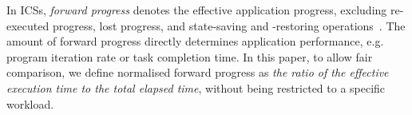 In ICSs, \textit{forward progress} denotes the effective application progress, excluding re-executed progress, lost progress, and state-saving and -restoring operations~\cite{7478428, 7056060}. The amount of forward progress directly determines application performance, e.g. program iteration rate or task completion time. In this paper, to allow fair comparison, we define normalised forward progress as \textit{the ratio of the effective execution time to the total elapsed time}, without being restricted to a specific workload. 



